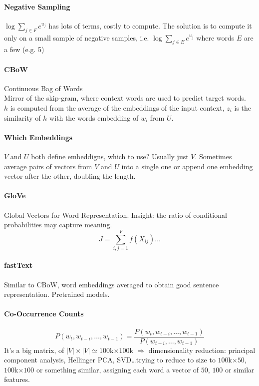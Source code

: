 \documentclass[10pt]{report}
\begin{document}
\paragraph{Negative Sampling} $\log\sum_{j\in F}e^{u_j}$ has lots of terms, costly to compute. The solution is to compute it only on a small sample of negative samples, i.e. $\log\sum_{j\in E}e^{u_j}$ where words $E$ are a few (e.g. 5) %
\paragraph{CBoW} Continuous Bag of Words\\
Mirror of the skip-gram, where context words are used to predict target words.\\
$h$ is computed from the average of the embeddings of the input context, $z_i$ is the similarity of $h$ with the words embedding of $w_i$ from $U$.
\paragraph{Which Embeddings} $V$ and $U$ both define embeddigns, which to use? Usually just $V$. Sometimes average pairs of vectors from $V$ and $U$ into a single one or append one embedding vector after the other, doubling the length.
\paragraph{GloVe} Global Vectors for Word Representation. Insight: the ratio of conditional probabilities may capture meaning.
$$J = \sum_{i,j=1}^V f(X_{ij})\ldots$$
\paragraph{fastText} Similar to CBoW, word embeddings averaged to obtain good sentence representation. Pretrained models.
\paragraph{Co-Occurrence Counts}
$$P(w_t,w_{t-i},\ldots,w_{t-1}) = \frac{P(w_t,w_{t-i},\ldots,w_{t-1})}{P(w_{t-i},\ldots,w_{t-1})}$$
It's a big matrix, of $|V|\times|V|\simeq 100$k$\times100$k $\Rightarrow$ dimensionality reduction: principal component analysis, Hellinger PCA, SVD\ldots trying to reduce to size to $100$k$\times 50$, $100$k$\times 100$ or something similar, assigning each word a vector of $50$, $100$ or similar features.
\end{document}
